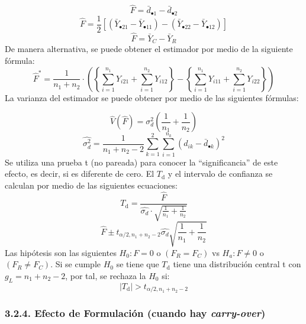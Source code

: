\documentclass[]{article}
\begin{document}
\[\hat{F} = \bar{d}_{\bullet1}-\bar{d}_{\bullet2}\]
\[\hat{F} = \frac{1}{2}\left[\left(\bar{Y}_{\bullet21}-\bar{Y}_{\bullet11}\right)-\left(\bar{Y}_{\bullet22}-\bar{Y}_{\bullet12}\right)\right]\]
\[\hat{F} = \bar{Y}_{C}-\bar{Y}_{R}\] De manera alternativa, se puede
obtener el estimador por medio de la siguiente fórmula:\\
\[\hat{F}^{*} = \frac{1}{n_{1}+n_{2}} \cdot\left(\left\{\sum_{i=1}^{n_{1}}{Y_{i21}}+\sum_{i=1}^{n_{2}}{Y_{i12}}\right\}-\left\{\sum_{i=1}^{n_{1}}{Y_{i11}}+\sum_{i=1}^{n_{2}}{Y_{i22}}\right\}\right )\]
La varianza del estimador se puede obtener por medio de las siguientes
fórmulas:

\[\hat{V}(\hat{F}) = \sigma_{d}^{2}\left (\frac{1}{n_{1}}+\frac{1}{n_{2}} \right )\]
\[\hat{\sigma_{d}^{2}} = \frac{1}{n_{1}+n_{2}-2} \sum_{k=1}^{2}\sum_{i=1}^{n_{k}}{(d_{ik}-\bar{d}_{\bullet k})^{2}}\]
Se utiliza una prueba t (no pareada) para conocer la ``significancia''
de este efecto, es decir, si es diferente de cero. El \(T_{\textrm{d}}\)
y el intervalo de confianza se calculan por medio de las siguientes
ecuaciones:\\
\[T_{\textrm{d}} = \frac{\hat{F}}{\hat{\sigma_{d}}\cdot\sqrt{\frac{1}{n_{1}}+\frac{1}{n_{2}}}}\]
\[\hat{F} \pm t_{\alpha/2, n_{1}+n_{2}-2} \hat{\sigma_{d}} \sqrt{\frac{1}{n_{1}}+\frac{1}{n_{2}}}\]
Las hipótesis son las siguientes \(H_{0}: F=0\) o \((F_{R} = F_{C})\) vs
\(H_{a}: F \neq 0\) o \((F_{R} \neq F_{C})\). Si se cumple \(H_{0}\) se
tiene que \(T_{\textrm{d}}\) tiene una distribución central t con
\(g_{L} = n_{1}+n_{2}-2\), por tal, se rechaza la \(H_{0}\) si:\\
\[\left |T_{\textrm{d}} \right | > t_{\alpha/2,n_{1}+n_{2}-2}\]

\subsubsection{\texorpdfstring{3.2.4. Efecto de Formulación (cuando hay
\emph{carry-over})}{3.2.4. Efecto de Formulación (cuando hay carry-over)}}\label{efecto-de-formulacion-cuando-hay-carry-over}
\end{document}
